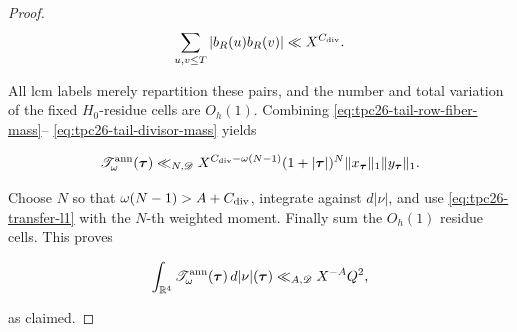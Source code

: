 \begin{proof}
\begin{equation}
 \sum_{u,v\le T}|b_R(u)b_R(v)|
 \ll X^{C_{\rm div}}.
 \label{eq:tpc26-tail-divisor-mass}
\end{equation}

All lcm labels merely repartition these pairs, and the number and total
variation of the fixed \(H_0\)-residue cells are \(O_h(1)\).  Combining
\eqref{eq:tpc26-tail-row-fiber-mass}--
\eqref{eq:tpc26-tail-divisor-mass} yields

\begin{equation}
 \mathscr T^{\rm ann}_{\omega}(\boldsymbol\tau)
 \ll_{N,\mathscr D}
 X^{C_{\rm div}-\omega(N-1)}
 (1+|\boldsymbol\tau|)^N
 \|x_{\boldsymbol\tau}\|_1
 \|y_{\boldsymbol\tau}\|_1.
 \label{eq:tpc26-tail-component-bound}
\end{equation}

Choose \(N\) so that
\(\omega(N-1)>A+C_{\rm div}\), integrate against \(d|\nu|\), and use
\eqref{eq:tpc26-transfer-l1} with the \(N\)-th weighted moment.  Finally
sum the \(O_h(1)\) residue cells.  This proves

\[
 \int_{\mathbb R^4}
 \mathscr T^{\rm ann}_{\omega}(\boldsymbol\tau)
 \,d|\nu|(\boldsymbol\tau)
 \ll_{A,\mathscr D}X^{-A}Q^2,
\]

as claimed.
\end{proof}
